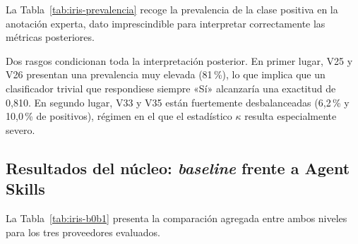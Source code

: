 La Tabla~\ref{tab:iris-prevalencia} recoge la prevalencia de la clase positiva
en la anotación experta, dato imprescindible para interpretar correctamente las
métricas posteriores.

\begin{table}[H]
    \centering
    \begingroup
    \small
    \endgroup
\end{table}

Dos rasgos condicionan toda la interpretación posterior. En primer lugar, V25 y
V26 presentan una prevalencia muy elevada (81\,\%), lo que implica que un
clasificador trivial que respondiese siempre «Sí» alcanzaría una exactitud de
0,810. En segundo lugar, V33 y V35 están fuertemente desbalanceadas (6,2\,\% y
10,0\,\% de positivos), régimen en el que el estadístico $\kappa$ resulta
especialmente severo.

\subsection{Resultados del núcleo: \textit{baseline} frente a Agent Skills}
\label{subsec:iris_core}

La Tabla~\ref{tab:iris-b0b1} presenta la comparación agregada entre ambos
niveles para los tres proveedores evaluados.

